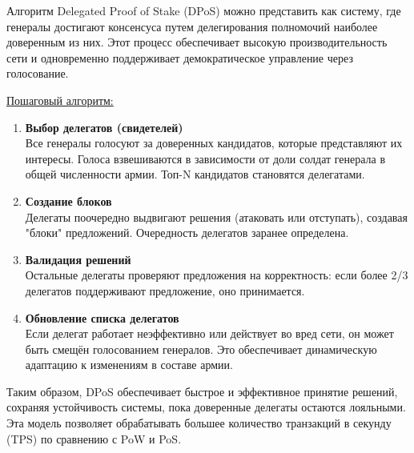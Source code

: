 \hspace{1.25cm}
Алгоритм Delegated Proof of Stake (DPoS) можно представить как систему, где генералы достигают консенсуса путем делегирования полномочий наиболее доверенным из них. Этот процесс обеспечивает высокую производительность сети и одновременно поддерживает демократическое управление через голосование.

\underline{Пошаговый алгоритм:}

\begin{enumerate}

	\item \textbf{Выбор делегатов (свидетелей)}\\
Все генералы голосуют за доверенных кандидатов, которые представляют их интересы. Голоса взвешиваются в зависимости от доли солдат генерала в общей численности армии. Топ-N кандидатов становятся делегатами.

	\item \textbf{Создание блоков}\\
Делегаты поочередно выдвигают решения (атаковать или отступать), создавая "блоки" предложений. Очередность делегатов заранее определена.

	\item \textbf{Валидация решений}\\
Остальные делегаты проверяют предложения на корректность: если более 2/3 делегатов поддерживают предложение, оно принимается.

	\item \textbf{Обновление списка делегатов}\\
Если делегат работает неэффективно или действует во вред сети, он может быть смещён голосованием генералов. Это обеспечивает динамическую адаптацию к изменениям в составе армии.

\end{enumerate}

Таким образом, DPoS обеспечивает быстрое и эффективное принятие решений, сохраняя устойчивость системы, пока доверенные делегаты остаются лояльными. Эта модель позволяет обрабатывать большее количество транзакций в секунду (TPS) по сравнению с PoW и PoS.~\cite{binance_DPoS}

\newpage